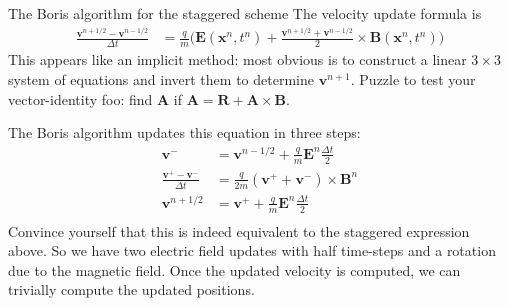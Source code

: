 \documentclass[pdf]{beamer}
\newcommand{\mvec}[1]{\mathbf{#1}}
\theoremstyle{definition}
\begin{document}
\begin{frame}{The Boris algorithm for the staggered scheme}
  \footnotesize%
  The velocity update formula is
  \begin{align*}
    \frac{\mvec{v}^{n+1/2}-\mvec{v}^{n-1/2}}{\Delta t} &= \frac{q}{m}
      \big(
        \mvec{E}(\mvec{x}^n,t^n) +
        \frac{\mvec{v}^{n+1/2}+\mvec{v}^{n-1/2}}{2}\times\mvec{B}(\mvec{x}^n,t^n)
      \big)
  \end{align*}
  This appears like an implicit method: most obvious is to construct a
  linear $3\times 3$ system of equations and invert them to determine
  $\mvec{v}^{n+1}$. Puzzle to test your vector-identity foo: find
  $\mvec{A}$ if $\mvec{A} = \mvec{R}+\mvec{A}\times\mvec{B}$.

  The Boris algorithm updates this equation in three steps:
  \begin{align*}
    \mvec{v}^- &= \mvec{v}^{n-1/2} + \frac{q}{m}\mvec{E}^n\frac{\Delta t}{2} \\
    \frac{\mvec{v}^+- \mvec{v}^-}{\Delta t}
    &=
      \frac{q}{2 m}(\mvec{v}^++\mvec{v}^-)\times\mvec{B}^n \\
    \mvec{v}^{n+1/2}
    &=
      \mvec{v}^{+} + \frac{q}{m}\mvec{E}^n\frac{\Delta t}{2} \\    
  \end{align*}
  Convince yourself that this is indeed equivalent to the staggered
  expression above. So we have two electric field updates with half
  time-steps and a rotation due to the magnetic field. Once the
  updated velocity is computed, we can trivially compute the updated
  positions.
\end{frame}  
\end{document}
